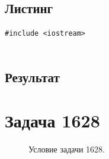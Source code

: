 \documentclass[a5paper, 10pt]{article}
\theoremstyle{definition}
\theoremstyle{plain}
\theoremstyle{remark}
\begin{document}
\subsection{Листинг}

\begin{center}
\begin{lstlisting}[label=some-code,caption={Исходный код для 1521}]
#include <iostream>


\end{lstlisting}
\end{center}

\subsection{Результат}




\newpage
\section{Задача 1628}

\begin{figure}[h!]
\caption{Условие задачи 1628.}
\end{figure}
\end{document}
